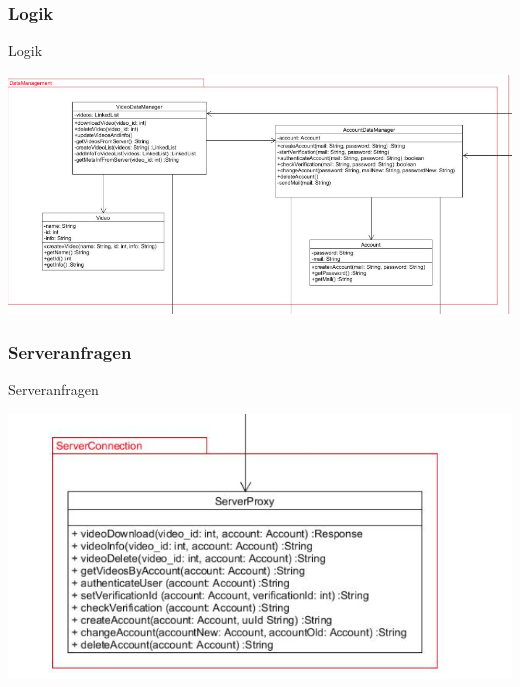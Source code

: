 \documentclass[19pt]{beamer}
\begin{document}
\subsubsection{Logik}
\begin{frame}{Logik}
\begin{center}
\includegraphics[scale=0.35]{resources/interface_logic.png}
\end{center}
\end{frame}
\subsubsection{Serveranfragen}
\begin{frame}{Serveranfragen}
\begin{center}
\includegraphics[scale=0.35]{resources/interface_serverconnection.png}
\end{center}
\end{frame}

\end{document}
